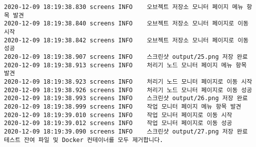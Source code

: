 \begin{Verbatim}[fontsize=\tiny, breaklines=true, breakanywhere=true]
2020-12-09 18:19:38.830 screens	INFO	오브젝트 저장소 모니터 페이지 메뉴 항목 발견
2020-12-09 18:19:38.840 screens	INFO	오브젝트 저장소 모니터 페이지로 이동 시작
2020-12-09 18:19:38.842 screens	INFO	오브젝트 저장소 모니터 페이지로 이동 성공
2020-12-09 18:19:38.907 screens	INFO	스크린샷 output/25.png 저장 완료
2020-12-09 18:19:38.913 screens	INFO	처리기 노드 모니터 페이지 메뉴 항목 발견
2020-12-09 18:19:38.923 screens	INFO	처리기 노드 모니터 페이지로 이동 시작
2020-12-09 18:19:38.926 screens	INFO	처리기 노드 모니터 페이지로 이동 성공
2020-12-09 18:19:38.993 screens	INFO	스크린샷 output/26.png 저장 완료
2020-12-09 18:19:38.999 screens	INFO	작업 모니터 페이지 메뉴 항목 발견
2020-12-09 18:19:39.010 screens	INFO	작업 모니터 페이지로 이동 시작
2020-12-09 18:19:39.012 screens	INFO	작업 모니터 페이지로 이동 성공
2020-12-09 18:19:39.090 screens	INFO	스크린샷 output/27.png 저장 완료
테스트 잔여 파일 및 Docker 컨테이너를 모두 제거합니다.
\end{Verbatim}
